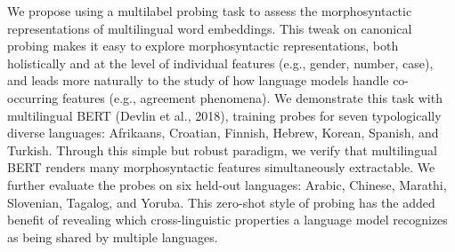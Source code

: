 We propose using a multilabel probing task to assess the morphosyntactic representations of multilingual word embeddings. This tweak on canonical probing makes it easy to explore morphosyntactic representations, both holistically and at the level of individual features (e.g., gender, number, case), and leads more naturally to the study of how language models handle co-occurring features (e.g., agreement phenomena). We demonstrate this task with multilingual BERT (Devlin et al., 2018), training probes for seven typologically diverse languages: Afrikaans, Croatian, Finnish, Hebrew, Korean, Spanish, and Turkish. Through this simple but robust paradigm, we verify that multilingual BERT renders many morphosyntactic features simultaneously extractable. We further evaluate the probes on six held-out languages: Arabic, Chinese, Marathi, Slovenian, Tagalog, and Yoruba. This zero-shot style of probing has the added benefit of revealing which cross-linguistic properties a language model recognizes as being shared by multiple languages.
